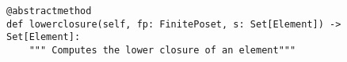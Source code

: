 \par\begin{minipage}{73ex}
\begin{verbatim}
@abstractmethod
def lowerclosure(self, fp: FinitePoset, s: Set[Element]) -> Set[Element]:
    """ Computes the lower closure of an element"""
\end{verbatim}
\end{minipage}\par